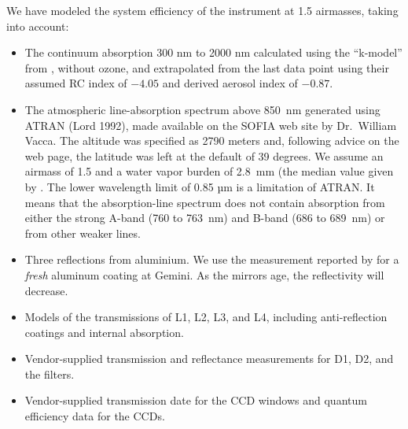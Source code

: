 We have modeled the system efficiency of the instrument at 1.5 airmasses, taking into account:
\begin{itemize}
\item The continuum absorption 300 nm to 2000 nm calculated using the “k-model” from \cite{Schuster-2001}, without ozone, and extrapolated from the last data point using their assumed RC index of $-4.05$ and derived aerosol index of $-0.87$. 

\item
The atmospheric line-absorption spectrum above 850~nm generated using ATRAN (Lord 1992), made available on the SOFIA web site by Dr.\ William Vacca. The altitude was specified as 2790 meters and, following advice on the web page, the latitude was left at the default of 39 degrees. We assume an airmass of 1.5 and a water vapor burden of 2.8~mm (the median value given by \cite{Otarola-2009}. The lower wavelength limit of 0.85 µm is a limitation of ATRAN. It means that the absorption-line spectrum does not contain absorption from either the strong A-band (760 to 763~nm) and B-band (686 to 689~nm) or from other weaker lines.

\item
Three reflections from aluminium. We use the measurement reported by \cite{Boccas-2006} for a \emph{fresh} aluminum coating at Gemini.  As the mirrors age, the reflectivity will decrease.

\item
Models of the transmissions of L1, L2, L3, and L4, including anti-reflection coatings and internal absorption.

\item
Vendor-supplied transmission and reflectance measurements for D1, D2, and the filters.

\item
Vendor-supplied transmission date for the CCD windows and quantum efficiency data for the CCDs.

\end{itemize}

